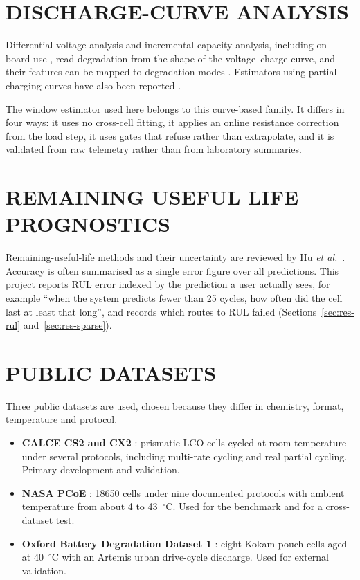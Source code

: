 \documentclass[12pt,a4paper]{amritareport}
\begin{document}
\section{DISCHARGE-CURVE ANALYSIS}

Differential voltage analysis \cite{bloom2005} and incremental capacity analysis, including on-board use \cite{weng2013}, read degradation from the shape of the voltage--charge curve, and their features can be mapped to degradation modes \cite{dubarry2012,birkl2017}. Estimators using partial charging curves have also been reported \cite{tian2021}.

The window estimator used here belongs to this curve-based family. It differs in four ways: it uses no cross-cell fitting, it applies an online resistance correction from the load step, it uses gates that refuse rather than extrapolate, and it is validated from raw telemetry rather than from laboratory summaries.

\section{REMAINING USEFUL LIFE PROGNOSTICS}

Remaining-useful-life methods and their uncertainty are reviewed by Hu \emph{et al.}\ \cite{hu2020}. Accuracy is often summarised as a single error figure over all predictions. This project reports RUL error indexed by the prediction a user actually sees, for example ``when the system predicts fewer than 25 cycles, how often did the cell last at least that long'', and records which routes to RUL failed (Sections~\ref{sec:res-rul} and~\ref{sec:res-sparse}).

\section{PUBLIC DATASETS}

Three public datasets are used, chosen because they differ in chemistry, format, temperature and protocol.

\begin{itemize}
    \item \textbf{CALCE CS2 and CX2} \cite{calce}: prismatic LCO cells cycled at room temperature under several protocols, including multi-rate cycling and real partial cycling. Primary development and validation.
    \item \textbf{NASA PCoE} \cite{saha2007}: 18650 cells under nine documented protocols with ambient temperature from about 4 to 43~$^\circ$C. Used for the benchmark and for a cross-dataset test.
    \item \textbf{Oxford Battery Degradation Dataset 1} \cite{howey2017oxford,birkl2017thesis}: eight Kokam pouch cells aged at 40~$^\circ$C with an Artemis urban drive-cycle discharge. Used for external validation.
\end{itemize}
\end{document}
